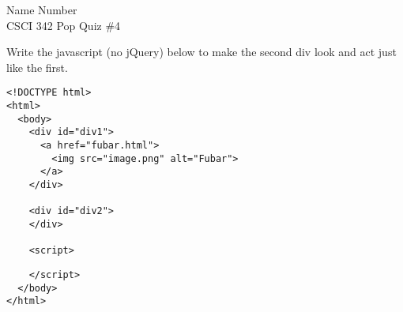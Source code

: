 \documentclass{article}
\begin{document}
Name \hrulefill Number \hrulefill\\
CSCI 342 Pop Quiz \#4

Write the javascript (no jQuery) below to make the second div
look and act just like the first.
\begin{Verbatim}
<!DOCTYPE html>
<html>
  <body>
    <div id="div1">
      <a href="fubar.html">
        <img src="image.png" alt="Fubar">
      </a>
    </div>

    <div id="div2">
    </div>

    <script>
\end{Verbatim}
\vfill
\begin{Verbatim}
    </script>
  </body>
</html>
\end{Verbatim}
\end{document}
